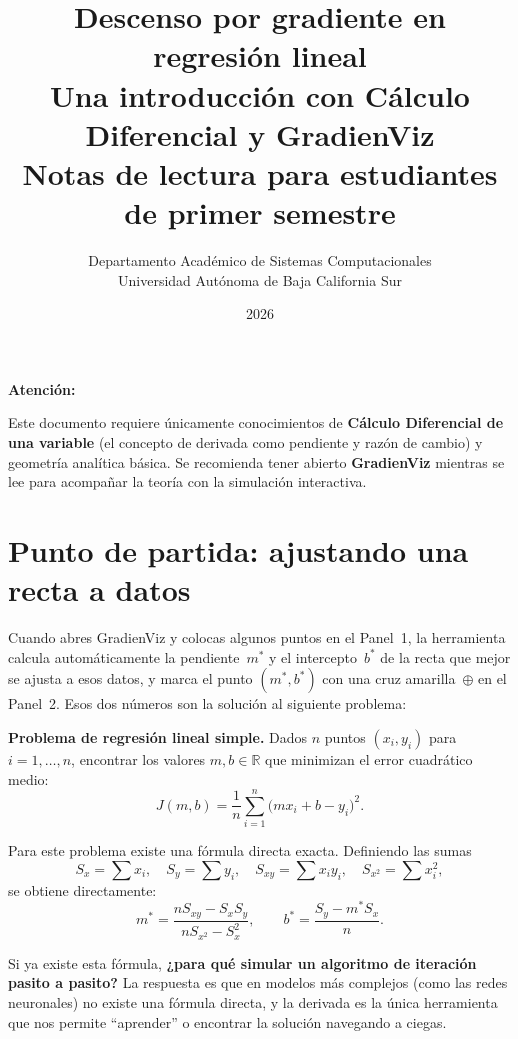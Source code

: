 \documentclass[12pt, a4paper]{article}
\title{
    {\Large\bfseries Descenso por gradiente en regresión lineal}\\[0.4em]
    {\large Una introducción con Cálculo Diferencial y GradienViz}\\[0.8em]
    {\normalsize Notas de lectura para estudiantes de primer semestre}
}
\author{
    Departamento Académico de Sistemas Computacionales\\
    Universidad Autónoma de Baja California Sur
}
\date{2026}
\newenvironment{vizadv}{%
    \begin{mdframed}[style=viznaranja]
    \textbf{\color{bordeadv}Atención:}\quad
}{%
    \end{mdframed}
}
\newenvironment{vizdef}{%
    \begin{mdframed}[style=vizazul]
}{%
    \end{mdframed}
}
\newcommand{\R}{\mathbb{R}}
\newcommand{\mstar}{m^{*}}
\newcommand{\bstar}{b^{*}}
\newcommand{\Jfun}{J(m,b)}
\begin{document}
\maketitle
\tableofcontents
\vspace{1em}

\begin{vizadv}
Este documento requiere únicamente conocimientos de \textbf{Cálculo Diferencial de una variable} (el concepto de derivada como pendiente y razón de cambio) y geometría analítica básica. Se recomienda tener abierto \textbf{GradienViz} mientras se lee para acompañar la teoría con la simulación interactiva.
\end{vizadv}

\section{Punto de partida: ajustando una recta a datos}

Cuando abres GradienViz y colocas algunos puntos en el Panel~1, la herramienta calcula automáticamente la pendiente~$\mstar$ y el intercepto~$\bstar$ de la recta que mejor se ajusta a esos datos, y marca el punto $(\mstar, \bstar)$ con una cruz amarilla~$\oplus$ en el Panel~2. Esos dos números son la solución al siguiente problema:

\begin{vizdef}
\textbf{Problema de regresión lineal simple.} Dados $n$ puntos $(x_i, y_i)$ para $i = 1, \ldots, n$, encontrar los valores $m, b \in \R$ que minimizan el error cuadrático medio:
\begin{equation}\label{eq:J}
    \Jfun = \frac{1}{n}\sum_{i=1}^{n}\bigl(m x_i + b - y_i\bigr)^2.
\end{equation}
\end{vizdef}

Para este problema existe una fórmula directa exacta. Definiendo las sumas
\[
    S_x = \sum x_i, \quad
    S_y = \sum y_i, \quad
    S_{xy} = \sum x_i y_i, \quad
    S_{x^2} = \sum x_i^2,
\]
se obtiene directamente:
\begin{equation}\label{eq:exacta}
    \mstar = \frac{n S_{xy} - S_x S_y}{n S_{x^2} - S_x^2}, \qquad
    \bstar = \frac{S_y - \mstar S_x}{n}.
\end{equation}

Si ya existe esta fórmula, \textbf{¿para qué simular un algoritmo de iteración pasito a pasito?} La respuesta es que en modelos más complejos (como las redes neuronales) no existe una fórmula directa, y la derivada es la única herramienta que nos permite ``aprender'' o encontrar la solución navegando a ciegas.
\end{document}
